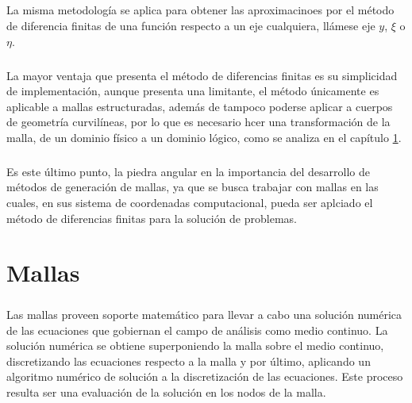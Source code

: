 \documentclass[letterpaper, openright, 12pt]{book}
\begin{document}
    \paragraph*{}
    La misma metodología se aplica para obtener las aproximacinoes por el método
    de diferencia finitas de una función respecto a un eje cualquiera, llámese
    eje $y$, $\xi$ o $\eta$.

    \paragraph*{}
    La mayor ventaja que presenta el método de diferencias finitas es su
    simplicidad de implementación, aunque presenta una limitante, el método
    únicamente es aplicable a mallas estructuradas, además de tampoco poderse
    aplicar a cuerpos de geometría curvilíneas, por lo que es necesario hcer una
    transformación de la malla, de un dominio físico a un dominio lógico, como
    se analiza en el capítulo \ref{chap:mallas}.

    \paragraph*{}
    Es este último punto, la piedra angular en la importancia del desarrollo de
    métodos de generación de mallas, ya que se busca trabajar con mallas en las
    cuales, en sus sistema de coordenadas computacional, pueda ser aplciado el
    método de diferencias finitas para la solución de problemas.

    \chapter{Mallas}
    \label{chap:mallas}
    \paragraph*{}
    Las mallas proveen soporte matemático para llevar a cabo una solución
    numérica de las ecuaciones que gobiernan el campo de análisis como medio
    continuo. La solución numérica se obtiene superponiendo la malla sobre el
    medio continuo, discretizando las ecuaciones respecto a la malla y por
    último, aplicando un algoritmo numérico de solución a la discretización de
    las ecuaciones. Este proceso resulta ser una evaluación de la solución en
    los nodos de la malla.
\end{document}
